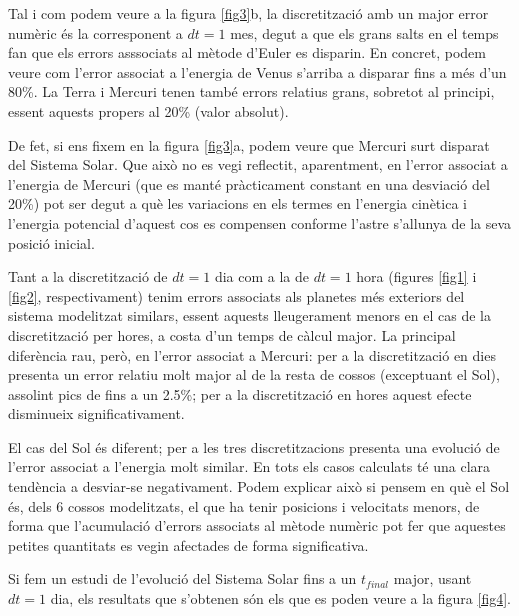 \documentclass[10pt, twoside, a4paper]{article}
\begin{document}
Tal i com podem veure a la figura \ref{fig3}b, la discretització amb un major error numèric és la corresponent a $dt = 1$ mes, degut a que els grans salts en el temps fan que els errors asssociats al mètode d'Euler es disparin. En concret, podem veure com l'error associat a l'energia de Venus s'arriba a disparar fins a més d'un 80\%. La Terra i Mercuri tenen també errors relatius grans, sobretot al principi, essent aquests propers al 20\% (valor absolut). 

De fet, si ens fixem en la figura \ref{fig3}a, podem veure que Mercuri surt disparat del Sistema Solar. Que això no es vegi reflectit, aparentment, en l'error associat a l'energia de Mercuri (que es manté pràcticament constant en una desviació del 20\%) pot ser degut a què les variacions en els termes en l'energia cinètica i l'energia potencial d'aquest cos es compensen conforme l'astre s'allunya de la seva posició inicial.

Tant a la discretització de $dt = 1$ dia com a la de $dt = 1$ hora (figures \ref{fig1} i \ref{fig2}, respectivament) tenim errors associats als planetes més exteriors del sistema modelitzat similars, essent aquests lleugerament menors en el cas de la discretització per hores, a costa d'un temps de càlcul major. La principal diferència rau, però, en l'error associat a Mercuri: per a la discretització en dies presenta un error relatiu molt major al de la resta de cossos (exceptuant el Sol), assolint pics de fins a un 2.5\%; per a la discretització en hores aquest efecte disminueix significativament.

El cas del Sol és diferent; per a les tres discretitzacions presenta una evolució de l'error associat a l'energia molt similar. En tots els casos calculats té una clara tendència a desviar-se negativament. Podem explicar això si pensem en què el Sol és, dels 6 cossos modelitzats, el que ha tenir posicions i velocitats menors, de forma que l'acumulació d'errors associats al mètode numèric pot fer que aquestes petites quantitats es vegin afectades de forma significativa.

Si fem un estudi de l'evolució del Sistema Solar fins a un $t_{final}$ major, usant $dt=1$ dia, els resultats que s'obtenen són els que es poden veure a la figura \ref{fig4}.
\end{document}

